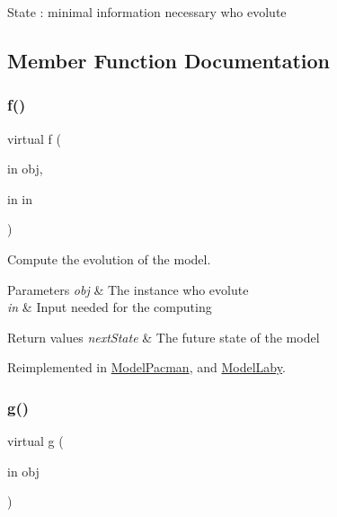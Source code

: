 State \+: minimal information necessary who evolute ~\newline
 

\subsection{Member Function Documentation}
\mbox{\label{class_model_s_e_d_ac36f9451c43b120828af4380858f2024}} 
\subsubsection{\texorpdfstring{f()}{f()}}
{\footnotesize\ttfamily virtual f (\begin{DoxyParamCaption}\item[{in}]{obj,  }\item[{in}]{in }\end{DoxyParamCaption})\hspace{0.3cm}{\ttfamily [virtual]}}



Compute the evolution of the model. 


\begin{DoxyParams}{Parameters}
{\em obj} & The instance who evolute \\
\hline
{\em in} & Input needed for the computing \\
\hline
\end{DoxyParams}

\begin{DoxyRetVals}{Return values}
{\em next\+State} & The future state of the model \\
\hline
\end{DoxyRetVals}


Reimplemented in \hyperlink{class_model_pacman_a6f3b146c92a207e95690d08975e1e072}{Model\+Pacman}, and \hyperlink{class_model_laby_a6f3b146c92a207e95690d08975e1e072}{Model\+Laby}.

\mbox{\label{class_model_s_e_d_ac6bf71081e35755d5ed9992d165afcb8}} 
\subsubsection{\texorpdfstring{g()}{g()}}
{\footnotesize\ttfamily virtual g (\begin{DoxyParamCaption}\item[{in}]{obj }\end{DoxyParamCaption})\hspace{0.3cm}{\ttfamily [virtual]}}



